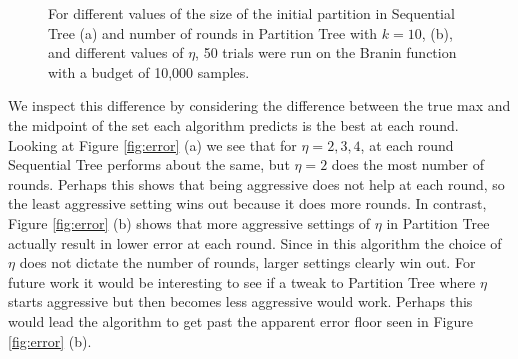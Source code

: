 \documentclass[11pt]{article}
\begin{document}
\begin{figure}
\begin{subfigure}[t]{.45\textwidth}
\end{subfigure}
\caption{For different values of the size of the initial partition in Sequential Tree (a) and number of rounds in Partition Tree with $k=10$, (b), and different values of $\eta$, 50 trials were run on the Branin function with a budget of 10,000 samples.}
\label{fig:argmax}
\end{figure}

We inspect this difference by considering the difference between the true max and the midpoint of the set each algorithm predicts is the best at each round. Looking at Figure \ref{fig:error} (a) we see that for $\eta=2,3,4$, at each round Sequential Tree performs about the same, but $\eta=2$ does the most number of rounds. Perhaps this shows that being aggressive does not help at each round, so the least aggressive setting wins out because it does more rounds. In contrast, Figure \ref{fig:error} (b) shows that more aggressive settings of $\eta$ in Partition Tree actually result in lower error at each round. Since in this algorithm the choice of $\eta$ does not dictate the number of rounds, larger settings clearly win out. For future work it would be interesting to see if a tweak to Partition Tree where $\eta$ starts aggressive but then becomes less aggressive would work. Perhaps this would lead the algorithm to get past the apparent error floor seen in Figure \ref{fig:error} (b).
\end{document}
